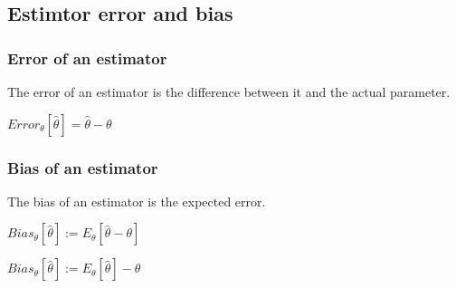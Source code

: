 
\subsection{Estimtor error and bias}

\subsubsection{Error of an estimator}

The error of an estimator is the difference between it and the actual parameter.

\(Error_{\theta }[\hat \theta ]=\hat \theta - \theta \)

\subsubsection{Bias of an estimator}

The bias of an estimator is the expected error.

\(Bias_\theta [\hat \theta ]:=E_\theta [\hat \theta -\theta ]\)

\(Bias_\theta [\hat \theta ]:=E_\theta [\hat \theta] -\theta\)


